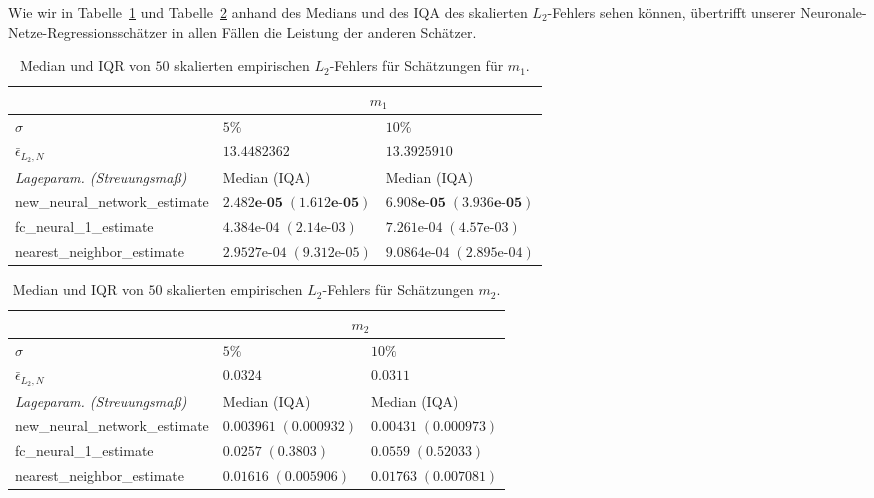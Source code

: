 
Wie wir in Tabelle~\ref{tab:truthTablesm1} und Tabelle~\ref{tab:truthTablesm2} anhand des Medians und des IQA des skalierten $L_2$-Fehlers sehen können, übertrifft unserer Neuronale-Netze-Regressionsschätzer in allen Fällen die Leistung der anderen Schätzer. 
\begin{table}
\centering
\begin{tabular}{ |p{5cm}||p{4cm}|p{4cm}|}
 \hline
 & \multicolumn{2}{|c|}{$m_1$}\\
 \hline
 $\sigma$& $5\%$ & $10\%$ \\
 \hline
 $\bar{\epsilon}_{L_2,N}$& $13.4482362$ & $13.3925910$ \\
 \hline
 \textit{Lageparam. (Streuungsmaß) }&  Median (IQA) &  Median (IQA)   \\
 \hline
 new\_neural\_network\_estimate & $\mathbf{2.482\textbf{e-}05 \; (1.612\textbf{e-}05)}$   & $\mathbf{6.908\textbf{e-}05 \; (3.936\textbf{e-}05)}$  \\
 fc\_neural\_1\_estimate & $4.384\text{e-}04 \; (2.14\text{e-}03)$ &   $7.261\text{e-}04 \; (4.57\text{e-}03)$ \\
 nearest\_neighbor\_estimate & $2.9527\text{e-}04 \; (9.312\text{e-}05)$ & $9.0864\text{e-}04 \; (2.895\text{e-}04)$\\
 \hline
\end{tabular}
    \caption{Median und IQR von $50$ skalierten empirischen $L_2$-Fehlers für Schätzungen für $m_1$.}
     \label{tab:truthTablesm1}   
\end{table}
    
    \begin{table}
\centering
\begin{tabular}{ |p{5cm}||p{4cm}|p{4cm}|}
 \hline
 & \multicolumn{2}{|c|}{$m_2$}\\
 \hline
 $\sigma$& $5\%$ & $10\%$ \\
 \hline
 $\bar{\epsilon}_{L_2,N}$& $0.0324$ & $0.0311$ \\
 \hline
 \textit{Lageparam. (Streuungsmaß)}&  Median (IQA) &  Median (IQA)   \\
 \hline
 new\_neural\_network\_estimate & $\mathbf{0.003961 \; (0.000932)}$   & $\mathbf{0.00431 \; (0.000973)}$  \\
 fc\_neural\_1\_estimate & $0.0257 \; (0.3803)$ &   $0.0559 \; (0.52033)$ \\
 nearest\_neighbor\_estimate & $0.01616 \; (0.005906)$ &$0.01763 \; (0.007081)$\\
 \hline
\end{tabular}
    \caption{Median und IQR von $50$ skalierten empirischen $L_2$-Fehlers für Schätzungen $m_2$.}
    \label{tab:truthTablesm2}   
\end{table}
